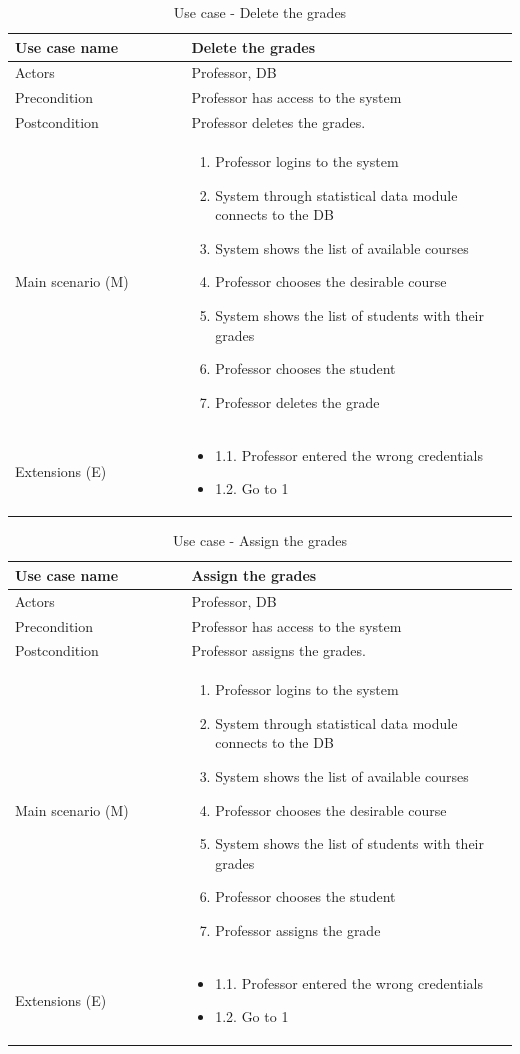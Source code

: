 \documentclass[12pt]{article}
\newcommand\tabularhead[1]{
\begin{table}[h]
  \caption{Use case - #1}
  \begin{tabular}{|p{0.35\linewidth}|p{0.65\linewidth}|}
    \hline
    \textbf{Use case name} & \textbf{#1} \\
    \hline}
\newcommand\addrow[2]{#1 &#2\\ \hline}
\newcommand\adddoublerow[2]{\begin{minipage}[t][][t]{2.5cm}#1\end{minipage}%
    &\begin{minipage}[t][][t]{\linewidth}
     \begin{itemize}\setlength{\itemsep}{0pt}%
        #2     
     \end{itemize}
     \end{minipage}\\ \hline}
\newcommand\addmulrow[2]{ \begin{minipage}[t][][t]{2.5cm}#1\end{minipage}%
     &\begin{minipage}[t][][t]{\linewidth}
      \begin{enumerate}\setlength{\itemsep}{0pt}%
        #2   
      \end{enumerate}
      \end{minipage}\\ \hline}
\newenvironment{usecase}{\tabularhead}
{\hline\end{tabular}\end{table}}
\begin{document}
\begin{usecase}{Delete the grades}
    \addrow{Actors}{Professor, DB}
    \addrow{Precondition}{Professor has access to the system}
    \addrow{Postcondition}{Professor deletes the grades.}
    \addmulrow{Main scenario (M)}{
        \item Professor logins to the system
        \item System through statistical data module connects to the DB
        \item System shows the list of available courses
        \item Professor chooses the desirable course
        \item System shows the list of students with their grades
        \item Professor chooses the student
        \item Professor deletes the grade
    }
    \adddoublerow{Extensions (E)}{
        \item[] 1.1. Professor entered the wrong credentials
        \item[] 1.2. Go to 1
    }
\end{usecase}
\newpage
\begin{usecase}{Assign the grades}
    \addrow{Actors}{Professor, DB}
    \addrow{Precondition}{Professor has access to the system}
    \addrow{Postcondition}{Professor assigns the grades.}
    \addmulrow{Main scenario (M)}{
        \item Professor logins to the system
        \item System through statistical data module connects to the DB
        \item System shows the list of available courses
        \item Professor chooses the desirable course
        \item System shows the list of students with their grades
        \item Professor chooses the student
        \item Professor assigns the grade
    }
    \adddoublerow{Extensions (E)}{
        \item[] 1.1. Professor entered the wrong credentials
        \item[] 1.2. Go to 1
    }
\end{usecase}
\end{document}
